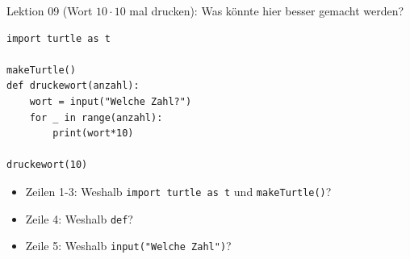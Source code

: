 \begin{frame}[fragile]{Lektion 09}
 (Wort $10\cdot 10$ mal drucken): Was könnte hier besser gemacht werden?
\begin{lstlisting}
import turtle as t

makeTurtle()
def druckewort(anzahl):
    wort = input("Welche Zahl?")
    for _ in range(anzahl):
        print(wort*10)
        
druckewort(10)
\end{lstlisting}
\begin{itemize}
    \item Zeilen 1-3: Weshalb \lstinline|import turtle as t| und \lstinline|makeTurtle()|?
    \item Zeile 4: Weshalb \lstinline|def|?
    \item Zeile 5: Weshalb \lstinline|input("Welche Zahl")|?
\end{itemize}
\end{frame}


